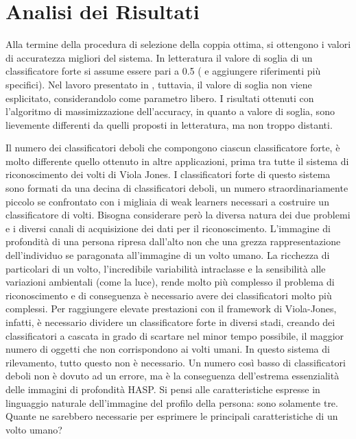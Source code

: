     \section{Analisi dei Risultati} %
    \label{sec:analisi_dei_risultati}
        Alla termine della procedura di selezione della coppia ottima, si ottengono i valori di accuratezza migliori del sistema.
            In letteratura il valore di soglia di un classificatore forte si assume essere pari a 0.5 (\cite{Freund97} e \cite{Viola04} aggiungere riferimenti più specifici). Nel lavoro presentato in \cite{Zhu13}, tuttavia, il valore di soglia non viene esplicitato, considerandolo come parametro libero.
            I risultati ottenuti con l'algoritmo di massimizzazione dell'accuracy, in quanto a valore di soglia, sono lievemente differenti da quelli proposti in letteratura, ma non troppo distanti.

            Il numero dei classificatori deboli che compongono ciascun classificatore forte, è molto differente quello ottenuto in altre applicazioni, prima tra tutte il sistema di riconoscimento dei volti di Viola Jones.
            I classificatori forte di questo sistema sono formati da una decina di classificatori deboli, un numero straordinariamente piccolo se confrontato con i migliaia di weak learners necessari a costruire un classificatore di volti.
            Bisogna considerare però la diversa natura dei due problemi e i diversi canali di acquisizione dei dati per il riconoscimento. L'immagine di profondità di una persona ripresa dall'alto non che una grezza rappresentazione dell'individuo se paragonata all'immagine di un volto umano.
            La ricchezza di particolari di un volto, l'incredibile variabilità intraclasse e la sensibilità alle variazioni ambientali (come la luce), rende molto più complesso il problema di riconoscimento e di conseguenza è necessario avere dei classificatori molto più complessi.
            Per raggiungere elevate prestazioni con il framework di Viola-Jones, infatti, è necessario dividere un classificatore forte in diversi stadi, creando dei classificatori a cascata in grado di scartare nel minor tempo possibile, il maggior numero di oggetti che non corrispondono ai volti umani.
            In questo sistema di rilevamento, tutto questo non è necessario. Un numero così basso di classificatori deboli non è dovuto ad un errore, ma è la conseguenza dell'estrema essenzialità delle immagini di profondità HASP.
            Si pensi alle caratteristiche espresse in linguaggio naturale dell'immagine del profilo della persona: sono solamente tre. Quante ne sarebbero necessarie per esprimere le principali caratteristiche di un volto umano?

